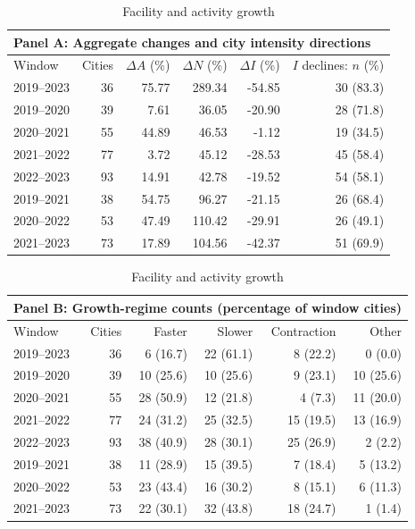 \begin{table}[htbp]\centering\small\caption{Facility and activity growth}\label{tab:growth_windows}
\begin{tabular}{@{}lrrrrr@{}}\toprule\multicolumn{6}{l}{Panel A: Aggregate changes and city intensity directions}\\\midrule
Window & Cities & $\Delta A$ (\%) & $\Delta N$ (\%) & $\Delta I$ (\%) & $I$ declines: $n$ (\%)\\
\midrule
2019--2023 & 36 & 75.77 & 289.34 & -54.85 & 30 (83.3)\\
2019--2020 & 39 & 7.61 & 36.05 & -20.90 & 28 (71.8)\\
2020--2021 & 55 & 44.89 & 46.53 & -1.12 & 19 (34.5)\\
2021--2022 & 77 & 3.72 & 45.12 & -28.53 & 45 (58.4)\\
2022--2023 & 93 & 14.91 & 42.78 & -19.52 & 54 (58.1)\\
2019--2021 & 38 & 54.75 & 96.27 & -21.15 & 26 (68.4)\\
2020--2022 & 53 & 47.49 & 110.42 & -29.91 & 26 (49.1)\\
2021--2023 & 73 & 17.89 & 104.56 & -42.37 & 51 (69.9)\\
\bottomrule\end{tabular}
\par\medskip\begin{tabular}{@{}lrrrrr@{}}\toprule\multicolumn{6}{l}{Panel B: Growth-regime counts (percentage of window cities)}\\\midrule
Window & Cities & Faster & Slower & Contraction & Other\\
\midrule
2019--2023 & 36 & 6 (16.7) & 22 (61.1) & 8 (22.2) & 0 (0.0)\\
2019--2020 & 39 & 10 (25.6) & 10 (25.6) & 9 (23.1) & 10 (25.6)\\
2020--2021 & 55 & 28 (50.9) & 12 (21.8) & 4 (7.3) & 11 (20.0)\\
2021--2022 & 77 & 24 (31.2) & 25 (32.5) & 15 (19.5) & 13 (16.9)\\
2022--2023 & 93 & 38 (40.9) & 28 (30.1) & 25 (26.9) & 2 (2.2)\\
2019--2021 & 38 & 11 (28.9) & 15 (39.5) & 7 (18.4) & 5 (13.2)\\
2020--2022 & 53 & 23 (43.4) & 16 (30.2) & 8 (15.1) & 6 (11.3)\\
2021--2023 & 73 & 22 (30.1) & 32 (43.8) & 18 (24.7) & 1 (1.4)\\
\bottomrule\end{tabular}\end{table}
